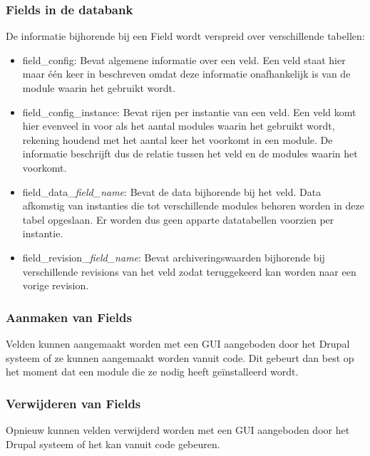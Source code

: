 \subsubsection{Fields in de databank}
De informatie bijhorende bij een Field wordt verspreid over verschillende tabellen:
\begin{itemize}
\item field\_config: Bevat algemene informatie over een veld. Een veld staat hier maar één keer in beschreven omdat deze informatie onafhankelijk is van de module waarin het gebruikt wordt.
\item field\_config\_instance: Bevat rijen per instantie van een veld. Een veld komt hier evenveel in voor als het aantal modules waarin het gebruikt wordt, rekening houdend met het aantal keer het voorkomt in een module. De informatie beschrijft dus de relatie tussen het veld en de modules waarin het voorkomt.
\item field\_data\_\textit{field\_name}: Bevat de data bijhorende bij het veld. Data afkomstig van instanties die tot verschillende modules behoren worden in deze tabel opgeslaan. Er worden dus geen apparte datatabellen voorzien per instantie.
\item field\_revision\_\textit{field\_name}: Bevat archiveringswaarden bijhorende bij verschillende revisions van het veld zodat teruggekeerd kan worden naar een vorige revision.
\end{itemize}

\subsubsection{Aanmaken van Fields}
Velden kunnen aangemaakt worden met een GUI aangeboden door het Drupal systeem of ze kunnen aangemaakt worden vanuit code. Dit gebeurt dan best op het moment dat een module die ze nodig heeft ge\"{i}nstalleerd wordt.
\subsubsection{Verwijderen van Fields}
Opnieuw kunnen velden verwijderd worden met een GUI aangeboden door het Drupal systeem of het kan vanuit code gebeuren.

